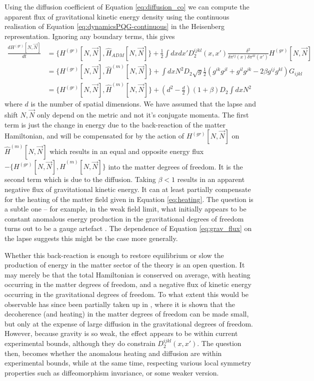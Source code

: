 \documentclass[aps,pra,showpacs,citeautoscript,amsmath,amssymb,floatfix,superscriptaddress,bbm, verbatim,amsfonts,changes,11pt,nofootinbib,longbibliography]{revtex4-2}
\def\Hq{\hat{H}}
\def\gravham{H^{(gr)}}
\def\qmatterham{\hat{H}^{(m)}}
\def\lapsh{[N,\vec{N}]}
\def\cqadm{{\Hq_{ADM}}}
\begin{document}
Using the diffusion coefficient of Equation \eqref{eq:diffusion_co} we can compute the apparent flux of gravitational kinetic energy density using the continuous realisation of Equation \eqref{eq:dynamicsPQG-continuous}  
in the Heisenberg representation. Ignoring any boundary terms, this gives
\begin{align}
\frac{d\gravham\lapsh}{dt}&=\{\gravham\lapsh,\cqadm\lapsh\}
+\frac{1}{2}\int dx dx' D_2^{ijkl}(x,x')\frac{\delta^2}{\delta\pi^{ij}(x)\delta\pi^{kl}(x')}\gravham\lapsh
\nonumber\\
&=\{\gravham\lapsh,\qmatterham\lapsh\}+\int dx N^2 D_2 \sqrt{g}
\frac{1}{2}\left(g^{ik}g^{jl}+g^{il}g^{jk}-2\beta g^{ij}g^{kl}\right)G_{ijkl}
\nonumber\\
&=\{\gravham\lapsh,\qmatterham\lapsh\}
+(d^2-\frac{d}{2})(1+\beta) D_2\int dx N^2\label{eq:grav_flux}
\end{align}
where $d$ is the number of spatial dimensions. We have assumed that the lapse and shift $N,\vec{N}$ only depend on the metric and not it's conjugate momenta. The first term
 is just the change in energy due to the back-reaction of the matter Hamiltonian, and will be compensated for by the action of $\gravham\lapsh$ on $\qmatterham\lapsh$
which results in an equal and opposite energy flux
 $-\{\gravham\lapsh,\qmatterham\lapsh\}$ into the matter degrees of freedom.  It is the second term which is due to the diffusion. Taking $\beta<1$ results in an apparent negative flux of gravitational kinetic energy. It can at least partially compensate for the heating of the matter field given in Equation \eqref{eq:heating}.
The question is a subtle one -- for example, in the weak field limit, what initially appears to be constant anomalous energy production in the gravitational degrees of freedom turns out to be a gauge artefact \cite{layton2023weak}. The dependence of Equation \eqref{eq:grav_flux} on the lapse suggests this might be the case more generally.
	
Whether this back-reaction is enough to restore equilibrium or slow the production of energy in the matter sector of the theory is an open question. It may merely be that the total Hamiltonian is conserved on average, with heating occurring in the matter degrees of freedom, and a negative flux of kinetic energy occurring in the gravitational degrees of freedom.
To what extent this would be observable has since been partially taken up in  \cite{oppenheim2021gravitationally}, where it is shown that the decoherence (and heating) in the matter degrees of freedom can be made small, but only at the expense of large diffusion in the gravitational degrees of freedom. However, because gravity is so weak, the effect appears to be within current experimental bounds, although they do constrain $D_2^{ijkl}(x,x')$. %
The question then, becomes whether the anomalous heating and diffusion are within experimental bounds, while at the same time, respecting various local symmetry properties such as diffeomorphism invariance, or some weaker version. 
\end{document}
